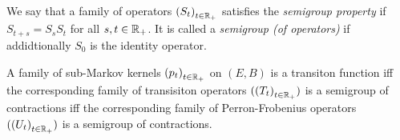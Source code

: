 \documentclass[../Master.tex]{subfiles}
\begin{document}
We say that a family of operators \({(S_t)}_{t \in \mathbb{R}_+}\) satisfies the \emph{semigroup property} if \(S_{t+s} = S_s S_t \) for all \(s, t \in \mathbb{R}_+ \). It is called a \textit{semigroup (of operators)} if addidtionally \(S_0\) is the identity operator.

\begin{lemma}\label{lem:first_correspondence}
  A family of sub-Markov kernels \({(p_t)}_{t \in \mathbb{R}_+}\) on \((E,B)\) is a transiton function iff the corresponding family of transisiton operators \(({(T_t)}_{t \in \mathbb{R}_+})\) is a semigroup of contractions iff the corresponding family of Perron-Frobenius operators \(({(U_t)}_{t \in \mathbb{R}_+})\) is a semigroup of contractions.
\end{lemma}
\end{document}
